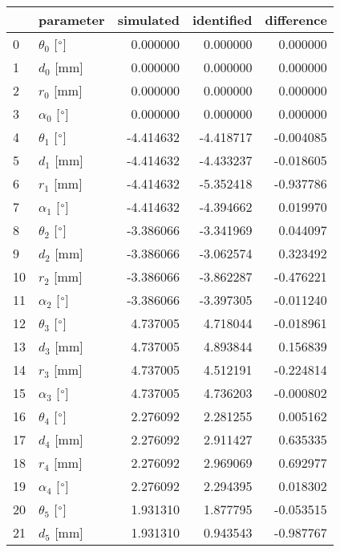\documentclass{standalone}%
\begin{document}
%
\normalsize%
\begin{tabular}{llrrr}
\toprule
{} &                 parameter & simulated & identified & difference \\
\midrule
0  &  $\theta_{0}$ [$\degree$] &  0.000000 &   0.000000 &   0.000000 \\
1  &              $d_{0}$ [mm] &  0.000000 &   0.000000 &   0.000000 \\
2  &              $r_{0}$ [mm] &  0.000000 &   0.000000 &   0.000000 \\
3  &  $\alpha_{0}$ [$\degree$] &  0.000000 &   0.000000 &   0.000000 \\
4  &  $\theta_{1}$ [$\degree$] & -4.414632 &  -4.418717 &  -0.004085 \\
5  &              $d_{1}$ [mm] & -4.414632 &  -4.433237 &  -0.018605 \\
6  &              $r_{1}$ [mm] & -4.414632 &  -5.352418 &  -0.937786 \\
7  &  $\alpha_{1}$ [$\degree$] & -4.414632 &  -4.394662 &   0.019970 \\
8  &  $\theta_{2}$ [$\degree$] & -3.386066 &  -3.341969 &   0.044097 \\
9  &              $d_{2}$ [mm] & -3.386066 &  -3.062574 &   0.323492 \\
10 &              $r_{2}$ [mm] & -3.386066 &  -3.862287 &  -0.476221 \\
11 &  $\alpha_{2}$ [$\degree$] & -3.386066 &  -3.397305 &  -0.011240 \\
12 &  $\theta_{3}$ [$\degree$] &  4.737005 &   4.718044 &  -0.018961 \\
13 &              $d_{3}$ [mm] &  4.737005 &   4.893844 &   0.156839 \\
14 &              $r_{3}$ [mm] &  4.737005 &   4.512191 &  -0.224814 \\
15 &  $\alpha_{3}$ [$\degree$] &  4.737005 &   4.736203 &  -0.000802 \\
16 &  $\theta_{4}$ [$\degree$] &  2.276092 &   2.281255 &   0.005162 \\
17 &              $d_{4}$ [mm] &  2.276092 &   2.911427 &   0.635335 \\
18 &              $r_{4}$ [mm] &  2.276092 &   2.969069 &   0.692977 \\
19 &  $\alpha_{4}$ [$\degree$] &  2.276092 &   2.294395 &   0.018302 \\
20 &  $\theta_{5}$ [$\degree$] &  1.931310 &   1.877795 &  -0.053515 \\
21 &              $d_{5}$ [mm] &  1.931310 &   0.943543 &  -0.987767 \\

\end{tabular}
\end{document}
